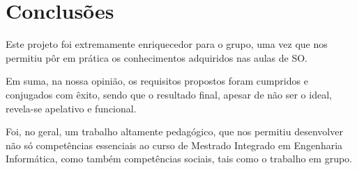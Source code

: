 \documentclass[a4paper]{article}
\begin{document}
\section{Conclusões}
\label{sec:conclusao}

Este projeto foi extremamente enriquecedor para o grupo, uma vez que nos permitiu pôr em prática os conhecimentos adquiridos nas aulas de SO.

Em suma, na nossa opinião, os requisitos propostos foram cumpridos e conjugados com êxito, sendo que o resultado final, apesar de não ser o ideal, revela-se apelativo e funcional.

Foi, no geral, um trabalho  altamente pedagógico, que nos permitiu desenvolver não só competências essenciais ao curso de Mestrado Integrado em Engenharia Informática, como também competências sociais, tais como o trabalho em grupo.
\end{document}
